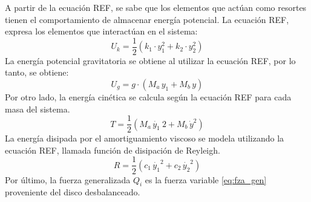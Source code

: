 A partir de la ecuación REF, se sabe que los elementos que actúan como resortes tienen el comportamiento de almacenar energía potencial. La ecuación REF, expresa los elementos que interactúan en el sistema:
\begin{equation}
	U_k = \frac{1}{2} \left(k_1\cdot y_1^2 + k_2\cdot y_2^2\right)
\end{equation}
La energía potencial gravitatoria se obtiene al utilizar la ecuación REF, por lo tanto, se obtiene:
\begin{equation}
	U_g = g\cdot \left(M_a\, y_1 + M_b\, y\right)
\end{equation}
Por otro lado, la energía cinética se calcula según la ecuación REF para cada masa del sistema.
\begin{equation}
	T = \frac{1}{2} \left(M_a\, \dot{y_1}\ 2 + M_b\, \dot{y}^2\right)
\end{equation}
La energía disipada por el amortiguamiento viscoso se modela utilizando la ecuación REF, llamada función de disipación de Reyleigh. 
\begin{equation}
	R = \frac{1}{2} \left(c_1\, \dot{y_1}^2 + c_2\, \dot{y_2}^2\right)
\end{equation}
Por último, la fuerza generalizada $Q_i$ es la fuerza variable \ref{eq:fza_gen} proveniente del disco desbalanceado.


